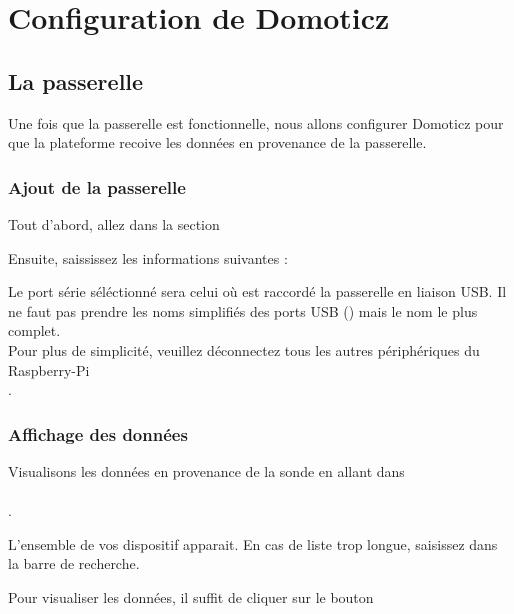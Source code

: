 

\part{Configuration de Domoticz}

\chapter{La passerelle}

Une fois que la passerelle est fonctionnelle, nous allons configurer Domoticz pour que la plateforme recoive 
les données en provenance de la passerelle.

\section{Ajout de la passerelle}

Tout d'abord, allez dans la section 


Ensuite, saississez les informations suivantes :


Le port série séléctionné sera celui où est raccordé la passerelle en liaison USB.
Il ne faut pas prendre les noms simplifiés des ports USB () mais le nom le plus complet.\\
Pour plus de simplicité, veuillez déconnectez tous les autres périphériques du Raspberry-Pi\\.


\section{Affichage des données}

Visualisons les données en provenance de la sonde en allant dans \\
\\.

L'ensemble de vos dispositif apparait. En cas de liste trop longue, saisissez  dans la barre de recherche.







Pour visualiser les données, il suffit de cliquer sur le bouton 



